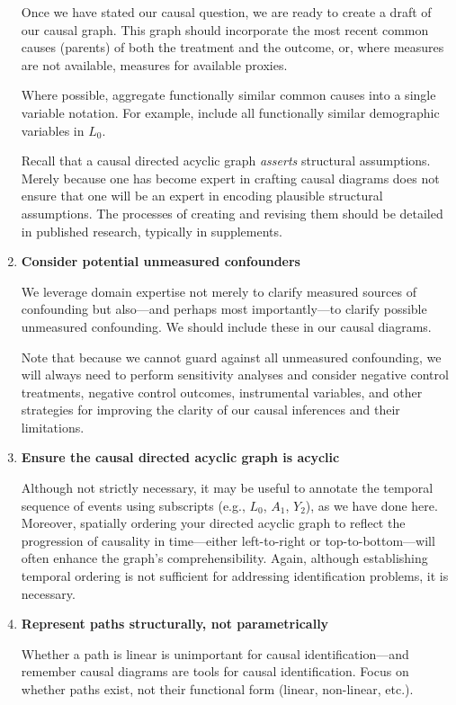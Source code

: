 \documentclass[
  single column]{article}
\begin{document}
\begin{enumerate}
  Once we have stated our causal question, we are ready to create a
  draft of our causal graph. This graph should incorporate the most
  recent common causes (parents) of both the treatment and the outcome,
  or, where measures are not available, measures for available proxies.

  Where possible, aggregate functionally similar common causes into a
  single variable notation. For example, include all functionally
  similar demographic variables in \(L_0\).

  Recall that a causal directed acyclic graph \emph{asserts} structural
  assumptions. Merely because one has become expert in crafting causal
  diagrams does not ensure that one will be an expert in encoding
  plausible structural assumptions. The processes of creating and
  revising them should be detailed in published research, typically in
  supplements.
\item
  \textbf{Consider potential unmeasured confounders}

  We leverage domain expertise not merely to clarify measured sources of
  confounding but also---and perhaps most importantly---to clarify
  possible unmeasured confounding. We should include these in our causal
  diagrams.

  Note that because we cannot guard against all unmeasured confounding,
  we will always need to perform sensitivity analyses and consider
  negative control treatments, negative control outcomes, instrumental
  variables, and other strategies for improving the clarity of our
  causal inferences and their limitations.
\item
  \textbf{Ensure the causal directed acyclic graph is acyclic}

  Although not strictly necessary, it may be useful to annotate the
  temporal sequence of events using subscripts (e.g., \(L_0\), \(A_1\),
  \(Y_2\)), as we have done here. Moreover, spatially ordering your
  directed acyclic graph to reflect the progression of causality in
  time---either left-to-right or top-to-bottom---will often enhance the
  graph's comprehensibility. Again, although establishing temporal
  ordering is not sufficient for addressing identification problems, it
  is necessary.
\item
  \textbf{Represent paths structurally, not parametrically}

  Whether a path is linear is unimportant for causal
  identification---and remember causal diagrams are tools for causal
  identification. Focus on whether paths exist, not their functional
  form (linear, non-linear, etc.).


\end{enumerate}
\end{document}
